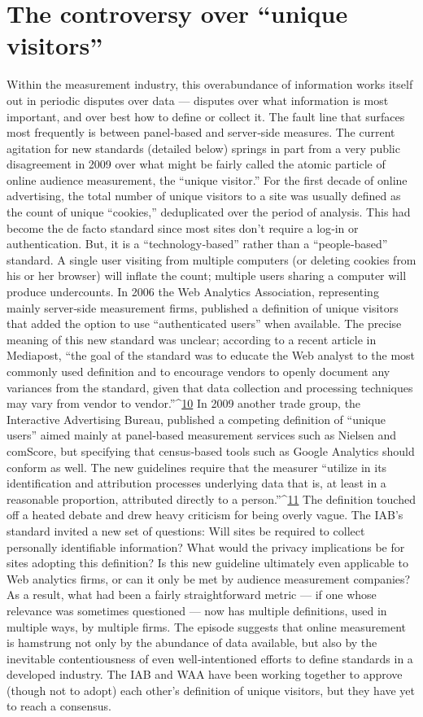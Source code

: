 \section{The controversy over ``unique visitors''}
Within the measurement industry, this overabundance of information
works itself out in periodic disputes over data — disputes over what
information is most important, and over best how to define or collect it.
The fault line that surfaces most frequently is between panel‐based and
server‐side measures. The current agitation for new standards (detailed
below) springs in part from a very public disagreement in 2009 over what
might be fairly called the atomic particle of online audience measurement,
the ``unique visitor.''
For the first decade of online advertising, the total number of unique
visitors to a site was usually defined as the count of unique ``cookies,'' deduplicated
over the period of analysis. This had become the de facto
standard since most sites don’t require a log‐in or authentication. But, it is
a ``technology‐based'' rather than a ``people‐based'' standard. A single
user visiting from multiple computers (or deleting cookies from his or her
browser) will inflate the count; multiple users sharing a computer will
produce undercounts.
In 2006 the Web Analytics Association, representing mainly server‐side
measurement firms, published a definition of unique visitors that added
the option to use ``authenticated users'' when available. The precise
meaning of this new standard was unclear; according to a recent article in
Mediapost, ``the goal of the standard was to educate the Web analyst to the
most commonly used definition and to encourage vendors to openly
document any variances from the standard, given that data collection and
processing techniques may vary from vendor to vendor.''^{\href{#endnotes}{10}}
In 2009 another trade group, the Interactive Advertising Bureau,
published a competing definition of ``unique users'' aimed mainly at
panel‐based measurement services such as Nielsen and comScore, but
specifying that census‐based tools such as Google Analytics should
conform as well. The new guidelines require that the measurer ``utilize in
its identification and attribution processes underlying data that is, at least
in a reasonable proportion, attributed directly to a person.''^{\href{#endnotes}{11}}
The definition touched off a heated debate and drew heavy criticism for
being overly vague. The IAB’s standard invited a new set of questions:
Will sites be required to collect personally identifiable information? What
would the privacy implications be for sites adopting this definition? Is this
new guideline ultimately even applicable to Web analytics firms, or can it
only be met by audience measurement companies?
As a result, what had been a fairly straightforward metric — if one whose
relevance was sometimes questioned — now has multiple definitions,
used in multiple ways, by multiple firms. The episode suggests that online
measurement is hamstrung not only by the abundance of data available,
but also by the inevitable contentiousness of even well‐intentioned efforts
to define standards in a developed industry. The IAB and WAA have been
working together to approve (though not to adopt) each other’s definition
of unique visitors, but they have yet to reach a consensus.
